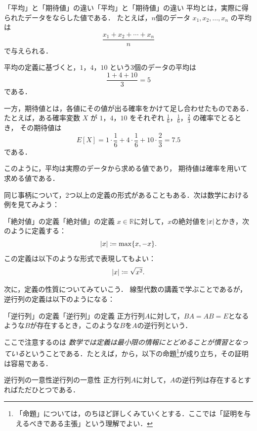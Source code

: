 \begin{example}{「平均」と「期待値」の違い}{「平均」と「期待値」の違い}
  平均とは，実際に得られたデータをならした値である．
  たとえば，$n$個のデータ $x_1,x_2,\dots,x_n$ の平均は
  \[
    \frac{x_1+x_2+\cdots+x_n}{n}
  \]
  で与えられる．

  平均の定義に基づくと，$1$，$4$，$10$ という3個のデータの平均は
  \[
    \frac{1+4+10}{3}=5
  \]
  である．

  一方，期待値とは，各値にその値が出る確率をかけて足し合わせたものである．
  たとえば，ある確率変数 $X$ が $1$，$4$，$10$ をそれぞれ
  $\frac{1}{6}$，$\frac{1}{6}$，$\frac{2}{3}$ の確率でとるとき，
  その期待値は
  \[
    E[X]=1\cdot\frac{1}{6}+4\cdot\frac{1}{6}+10\cdot\frac{2}{3}=7.5
  \]
  である．

  このように，平均は実際のデータから求める値であり，
  期待値は確率を用いて求める値である．
\end{example}


同じ事柄について，2つ以上の定義の形式があることもある．次は数学における例を見てみよう：

\begin{example}{「絶対値」の定義}{「絶対値」の定義}
  $ x \in \mathbb{R}$に対して，$x$の絶対値を$\lvert x\rvert$とかき，次のように定義する：
  \[
    \lvert x\rvert \coloneqq \max \{ x , -x \} .
  \]
  この定義は以下のような形式で表現してもよい：
  \[
    \lvert x\rvert \coloneqq  \sqrt{x^2}.
  \]
\end{example}

次に，定義の性質についてみていこう．
線型代数の講義で学ぶことであるが，逆行列の定義は以下のようになる：

\begin{example}{「逆行列」の定義}{「逆行列」の定義}
  正方行列$A$に対して，$BA = AB =E$となるような$B$が存在するとき，このような$B$を$A$の逆行列という．
\end{example}


ここで注意するのは \emph{数学では定義は最小限の情報にとどめることが慣習となっている}ということである．たとえば，から，以下の命題\footnote{「命題」については，のちほど詳しくみていくとする．ここでは「証明を与えるべきである主張」という理解でよい．}が成り立ち，その証明は容易である．

\begin{prop}{逆行列の一意性}{逆行列の一意性}
  正方行列$A$に対して，$A$の逆行列は存在するとすればただひとつである．
\end{prop}

